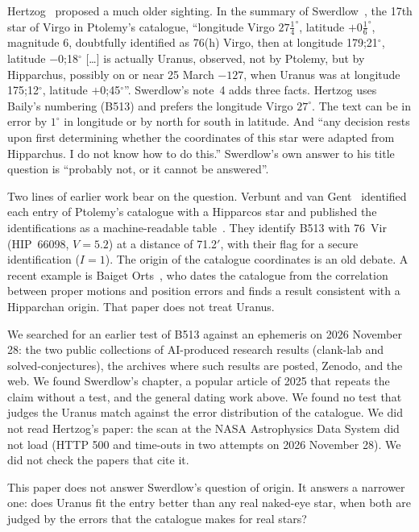 \documentclass[11pt]{article}
\newcommand{\am}{$'$}
\begin{document}
Hertzog~\cite{hertzog1988} proposed a much older sighting. In the summary of Swerdlow~\cite[p.~144]{swerdlow2020}, the 17th star of Virgo in Ptolemy's catalogue, ``longitude Virgo $27\tfrac14^\circ$, latitude $+0\tfrac16^\circ$, magnitude 6, doubtfully identified as 76(h) Virgo, then at longitude 179;21$^\circ$, latitude $-0$;18$^\circ$ [\ldots] is actually Uranus, observed, not by Ptolemy, but by Hipparchus, possibly on or near 25 March $-127$, when Uranus was at longitude 175;12$^\circ$, latitude $+0$;45$^\circ$''. Swerdlow's note~4 adds three facts. Hertzog uses Baily's numbering (B513) and prefers the longitude Virgo $27^\circ$. The text can be in error by $1^\circ$ in longitude or by north for south in latitude. And ``any decision rests upon first determining whether the coordinates of this star were adapted from Hipparchus. I do not know how to do this.'' Swerdlow's own answer to his title question is ``probably not, or it cannot be answered''.

Two lines of earlier work bear on the question. Verbunt and van Gent~\cite{verbunt2012} identified each entry of Ptolemy's catalogue with a Hipparcos star and published the identifications as a machine-readable table~\cite{vizierVvG}. They identify B513 with 76~Vir (HIP~66098, $V=5.2$) at a distance of 71.2\am, with their flag for a secure identification ($I=1$). The origin of the catalogue coordinates is an old debate. A recent example is Baiget Orts~\cite{baiget2026}, who dates the catalogue from the correlation between proper motions and position errors and finds a result consistent with a Hipparchan origin. That paper does not treat Uranus.

We searched for an earlier test of B513 against an ephemeris on 2026 November 28: the two public collections of AI-produced research results (clank-lab and solved-conjectures), the archives where such results are posted, Zenodo, and the web. We found Swerdlow's chapter, a popular article of 2025 that repeats the claim without a test, and the general dating work above. We found no test that judges the Uranus match against the error distribution of the catalogue. We did not read Hertzog's paper: the scan at the NASA Astrophysics Data System did not load (HTTP 500 and time-outs in two attempts on 2026 November 28). We did not check the papers that cite it.

This paper does not answer Swerdlow's question of origin. It answers a narrower one: does Uranus fit the entry better than any real naked-eye star, when both are judged by the errors that the catalogue makes for real stars?
\end{document}
